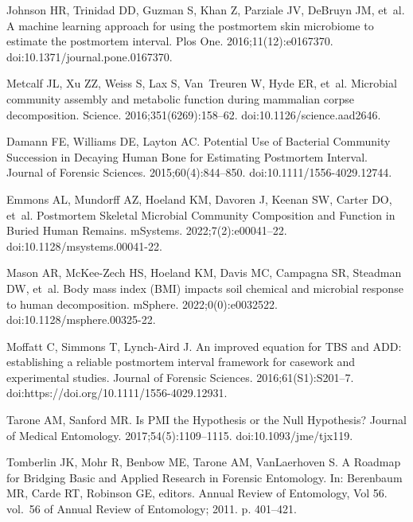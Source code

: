 \documentclass[
  10pt,
  letterpaper,
]{article}
\begin{document}
\begin{thebibliography}{10}
    Johnson HR, Trinidad DD, Guzman S, Khan Z, Parziale JV, DeBruyn JM, et~al.
    \newblock A machine learning approach for using the postmortem skin microbiome to estimate the postmortem interval.
    \newblock Plos One. 2016;11(12):e0167370.
    \newblock doi:{10.1371/journal.pone.0167370}.
    
    Metcalf JL, Xu ZZ, Weiss S, Lax S, Van~Treuren W, Hyde ER, et~al.
    \newblock Microbial community assembly and metabolic function during mammalian corpse decomposition.
    \newblock Science. 2016;351(6269):158--62.
    \newblock doi:{10.1126/science.aad2646}.
    
    Damann FE, Williams DE, Layton AC.
    \newblock Potential {Use} of {Bacterial} {Community} {Succession} in {Decaying} {Human} {Bone} for {Estimating} {Postmortem} {Interval}.
    \newblock Journal of Forensic Sciences. 2015;60(4):844--850.
    \newblock doi:{10.1111/1556-4029.12744}.
    
    Emmons AL, Mundorff AZ, Hoeland KM, Davoren J, Keenan SW, Carter DO, et~al.
    \newblock Postmortem {Skeletal} {Microbial} {Community} {Composition} and {Function} in {Buried} {Human} {Remains}.
    \newblock mSystems. 2022;7(2):e00041--22.
    \newblock doi:{10.1128/msystems.00041-22}.
    
    Mason AR, McKee-Zech HS, Hoeland KM, Davis MC, Campagna SR, Steadman DW, et~al.
    \newblock Body mass index ({BMI}) impacts soil chemical and microbial response to human decomposition.
    \newblock mSphere. 2022;0(0):e0032522.
    \newblock doi:{10.1128/msphere.00325-22}.
    
    Moffatt C, Simmons T, Lynch-Aird J.
    \newblock An improved equation for {TBS} and {ADD}: establishing a reliable postmortem interval framework for casework and experimental studies.
    \newblock Journal of Forensic Sciences. 2016;61(S1):S201--7.
    \newblock doi:{https://doi.org/10.1111/1556-4029.12931}.
    
    Tarone AM, Sanford MR.
    \newblock Is {PMI} the {Hypothesis} or the {Null} {Hypothesis}?
    \newblock Journal of Medical Entomology. 2017;54(5):1109--1115.
    \newblock doi:{10.1093/jme/tjx119}.
    
    Tomberlin JK, Mohr R, Benbow ME, Tarone AM, VanLaerhoven S.
    \newblock A {Roadmap} for {Bridging} {Basic} and {Applied} {Research} in {Forensic} {Entomology}.
    \newblock In: Berenbaum MR, Carde RT, Robinson GE, editors. Annual {Review} of {Entomology}, {Vol} 56. vol.~56 of Annual {Review} of {Entomology}; 2011. p. 401--421.
    

\end{thebibliography}
\end{document}

